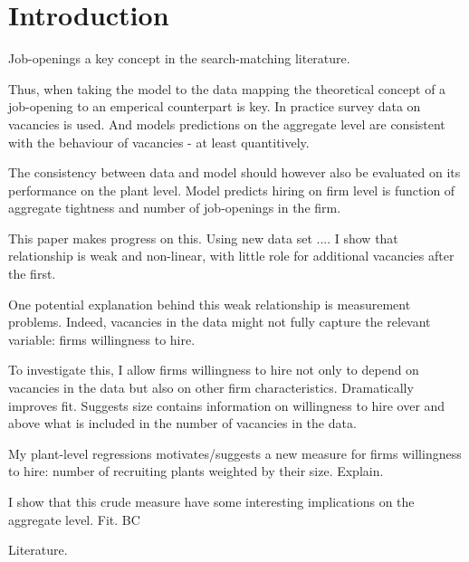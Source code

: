 \section{Introduction}

Job-openings a key concept in the search-matching literature. 

Thus, when taking the model to the data mapping the theoretical concept of a job-opening to an emperical counterpart is key. 
In practice survey data on vacancies is used.
And models predictions on the aggregate level are consistent with the behaviour of vacancies - at least quantitively.  

The consistency between data and model should however also be evaluated on its performance on the plant level. Model predicts hiring on firm level is function of aggregate tightness and number of job-openings in the firm. 

This paper makes progress on this. Using new data set .... I show that relationship is weak and non-linear, with little role for additional vacancies after the first.

One potential explanation behind this weak relationship is measurement problems. Indeed, vacancies in the data might not fully capture the relevant variable: firms willingness to hire. 

To investigate this, I allow firms willingness to hire not only to depend on vacancies in the data but also on other firm characteristics. Dramatically improves fit. Suggests size contains information on willingness to hire over and above what is included in the number of vacancies in the data. 

My plant-level regressions motivates/suggests a new measure for firms willingness to hire: number of recruiting plants weighted by their size. Explain.

I show that this crude measure have some interesting implications on the aggregate level. Fit. BC

Literature. 